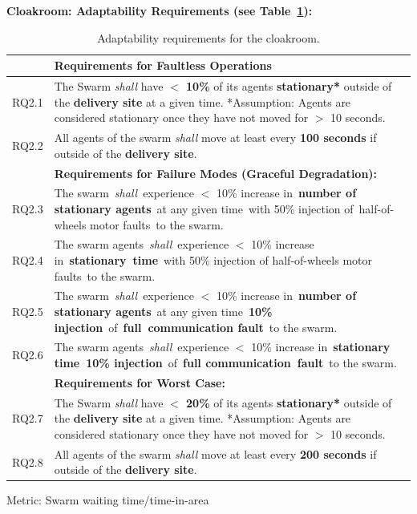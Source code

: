 \documentclass[lettersize,journal]{IEEEtran}
\begin{document}
\noindent \textbf{Cloakroom: Adaptability Requirements (see Table~\ref{tab:adaptability}):}
\begin{table}[!h]
	\centering
	\begin{tabular}{|p{7mm}|p{72mm}|}
		\hline
		& \textbf{Requirements for Faultless Operations} \\
		\hline
		RQ2.1 & The Swarm \emph{shall} have \textbf{$<$ 10\%} of its agents \textbf{stationary*} outside of the \textbf{delivery site} at a given time.
		*Assumption: Agents are considered stationary once they have not moved for $>$ 10 seconds.
		\\ 
		\hline
		RQ2.2 & All agents of the swarm \emph{shall} move at least every \textbf{100 seconds} if outside of the \textbf{delivery site}. \\ 
		\hline
		& \textbf{Requirements for Failure Modes (Graceful Degradation): } \\
		\hline
		RQ2.3 & The swarm \emph{shall} experience $<$ 10\% increase in \textbf{number of stationary agents} at any given time with 50\% injection of half-of-wheels motor faults to the swarm. \\
		\hline
		RQ2.4 & The swarm agents \emph{shall} experience $<$ 10\% increase in \textbf{stationary time} with 50\% injection of half-of-wheels motor faults to the swarm.\\ 
		\hline
		RQ2.5 & The swarm \emph{shall} experience $<$ 10\% increase in \textbf{number of stationary agents} at any given time \textbf{10\% injection} of \textbf{full communication fault} to the swarm.\\
		\hline
		RQ2.6 & The swarm agents \emph{shall} experience $<$ 10\% increase in \textbf{stationary time 10\% injection} of \textbf{full communication fault} to the swarm. \\	
		\hline
		& \textbf{Requirements for Worst Case: } \\
		\hline
		RQ2.7 & The Swarm \emph{shall} have \textbf{$<$ 20\%} of its agents \textbf{stationary*} outside of the \textbf{delivery site} at a given time.
		*Assumption: Agents are considered stationary once they have not moved for $>$ 10 seconds. \\			\hline	
		RQ2.8 & All agents of the swarm \emph{shall} move at least every \textbf{200 seconds} if outside of the \textbf{delivery site}.\\		[1ex] 		
		\hline
	\end{tabular}
	\caption{\label{tab:adaptability}Adaptability requirements for the cloakroom.}
\end{table}   
\noindent Metric: Swarm waiting time/time-in-area
\end{document}
